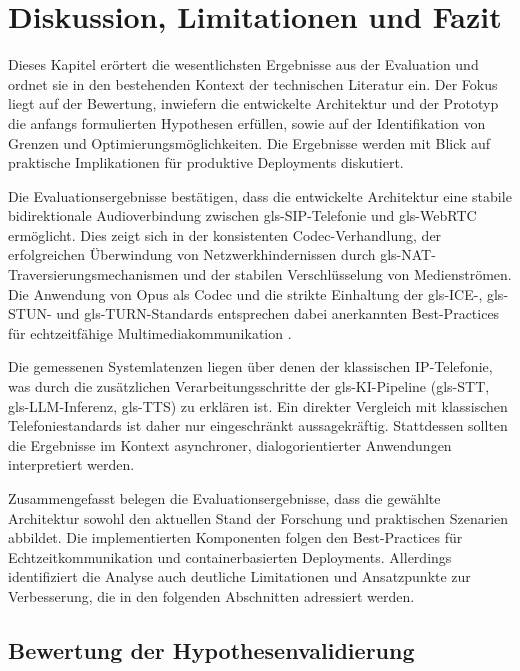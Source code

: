 \chapter{Diskussion, Limitationen und Fazit}\label{chap:diskussion}

Dieses Kapitel erörtert die wesentlichsten Ergebnisse aus der Evaluation und ordnet sie in den bestehenden Kontext der technischen Literatur ein. Der Fokus liegt auf der Bewertung, inwiefern die entwickelte Architektur und der Prototyp die anfangs formulierten Hypothesen erfüllen, sowie auf der Identifikation von Grenzen und Optimierungsmöglichkeiten. Die Ergebnisse werden mit Blick auf praktische Implikationen für produktive Deployments diskutiert.

Die Evaluationsergebnisse bestätigen, dass die entwickelte Architektur eine stabile bidirektionale Audioverbindung zwischen \gls{gls-SIP}-Telefonie und \gls{gls-WebRTC} ermöglicht. Dies zeigt sich in der konsistenten Codec-Verhandlung, der erfolgreichen Überwindung von Netzwerkhindernissen durch \gls{gls-NAT}-Traversierungsmechanismen und der stabilen Verschlüsselung von Medienströmen. Die Anwendung von Opus als Codec und die strikte Einhaltung der \gls{gls-ICE}-, \gls{gls-STUN}- und \gls{gls-TURN}-Standards entsprechen dabei anerkannten Best-Practices für echtzeitfähige Multimediakommunikation \parencite{rfc5245,rfc5766,rfc5764,rfc6716}.

Die gemessenen Systemlatenzen liegen über denen der klassischen IP-Telefonie, was durch die zusätzlichen Verarbeitungsschritte der \gls{gls-KI}-Pipeline (\gls{gls-STT}, \gls{gls-LLM}-Inferenz, \gls{gls-TTS}) zu erklären ist. Ein direkter Vergleich mit klassischen Telefoniestandards ist daher nur eingeschränkt aussagekräftig. Stattdessen sollten die Ergebnisse im Kontext asynchroner, dialogorientierter Anwendungen interpretiert werden.

Zusammengefasst belegen die Evaluationsergebnisse, dass die gewählte Architektur sowohl den aktuellen Stand der Forschung und praktischen Szenarien abbildet. Die implementierten Komponenten folgen den Best-Practices für Echtzeitkommunikation und containerbasierten Deployments. Allerdings identifiziert die Analyse auch deutliche Limitationen und Ansatzpunkte zur Verbesserung, die in den folgenden Abschnitten adressiert werden.

\section{Bewertung der Hypothesenvalidierung}

